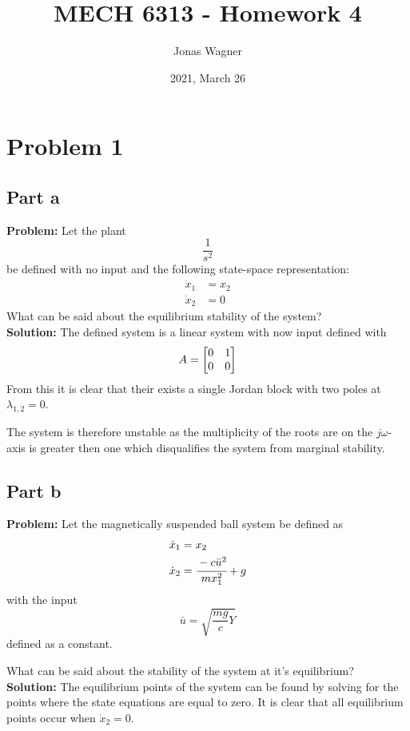 \documentclass[letter]{article}
\title{MECH 6313 - Homework 4}
\author{Jonas Wagner}
\date{2021, March 26}
\begin{document}
\maketitle


\section{Problem 1}

\subsection{Part a}
\textbf{Problem:}
Let the plant $$\frac{1}{s^2}$$ be defined with no input and the following state-space representation: 
\begin{equation}
	\begin{aligned}
		\dot{x}_1 &= x_2\\
		\dot{x}_2 &= 0
	\end{aligned}
\end{equation}
What can be said about the equilibrium stability of the system?\\

\noindent
\textbf{Solution:}
The defined system is a linear system with now input defined with $$A = \mqty[0&1\\0&0]$$
From this it is clear that their exists a single Jordan block with two poles at $\lambda_{1,2} = 0$.

The system is therefore unstable as the multiplicity of the roots are on the $j\omega$-axis is greater then one which disqualifies the system from marginal stability.

\subsection{Part b}
\textbf{Problem:}
Let the magnetically suspended ball system be defined as
\begin{equation}
	\begin{aligned}
		\dot{x}_1 &= x_2\\
		\dot{x}_2 &= \cfrac{-c \bar{u}^2}{m x_1^2} + g
	\end{aligned}
\end{equation}
with the input $$\bar{u}= \sqrt{\frac{mg}{c}Y}$$ defined as a constant.

What can be said about the stability of the system at it's equilibrium?\\

\noindent
\textbf{Solution:}
The equilibrium points of the system can be found by solving for the points where the state equations are equal to zero.
It is clear that all equilibrium points occur when $\dot{x}_2 = 0$.
\end{document}
